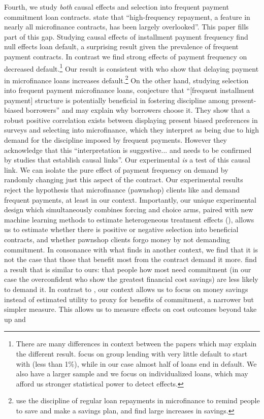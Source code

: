 \documentclass[oneside,11pt]{article}
\begin{document}
Fourth, we study \textit{both} causal effects and selection into frequent payment commitment loan contracts. \cite{Ghatak} state that ``high-frequency repayment, a feature in nearly all microfinance contracts, has been largely overlooked''. %
This paper fills part of this gap. Studying causal effects of installment payment frequency \cite{Pande} find null effects loan default, a surprising result given the prevalence of frequent payment contracts. In contrast  we find strong effects of payment frequency on decreased default.\footnote{There are many differences in context between the papers which may explain the different result. \cite{Pande} focus on group lending with very little default to start with (less than 1\%), while in our case almost half of loans end in default. We also have a larger sample and we focus on individualized loans, which may afford us stronger statistical power to detect effects.} Our result is consistent with \cite{Field} who show that delaying payment in microfinance loans increases default.\footnote{\cite{Craig} use the discipline of regular loan repayments in microfinance to remind people to save and make a savings plan, and find large increases in savings.} On the other hand, studying selection into frequent payment microfinance loans, \cite{Murdoch} conjecture that ``[frequent installment payment] structure is potentially beneficial in fostering discipline among present-biased borrowers'' and may explain why borrowers choose it.  They show that a robust positive correlation exists between displaying present biased preferences in surveys and selecting into microfinance, which they interpret as being due to high demand for the discipline imposed by frequent payments. However they acknowledge that this ``interpretation is suggestive... and needs to be confirmed by studies that establish causal links''. Our experimental \textit{is} a test of this causal link. We can isolate the pure effect of payment frequency on demand by randomly changing just this aspect of the contract. Our experimental results reject the hypothesis that microfinance (pawnshop) clients like and demand frequent payments, at least in our context. Importantly, our unique experimental design which simultaneously combines forcing and choice arms, paired with new machine learning methods to estimate heterogeneous treatment effects (\cite{atheygrf}), allows us to estimate whether there is positive or negative selection into beneficial contracts, and whether pawnshop clients forgo money by not demanding commitment. In consonance with what \cite{Walters} finds in another context, we find that it is not the case that those that benefit most from the contract demand it more. \cite{Sprenger} find a result that is similar to ours: that people how most need commitment (in our case the overconfident who show the greatest financial cost savings) are less likely to demand it. In contrast to \cite{Sprenger}, our context allows us to focus on money savings instead of estimated utility to proxy for benefits of commitment, a narrower but simpler measure. This allows us to measure effects on cost outcomes beyond take up and 
\end{document}
